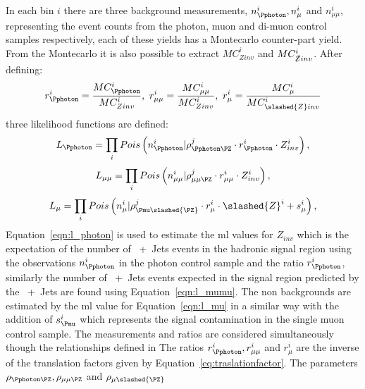In each \HT bin $i$ there are three background measurements, $n_{\Pphoton}^{i}, 
n^{i}_{\mu}$ and $n^{i}_{\mu\mu}$, representing the event counts from the 
photon, muon and di-muon control samples respectively, each of these yields has 
a Montecarlo counter-part yield. From the Montecarlo it is also possible to 
extract $MC^{i}_{Zinv}$ and $MC^{i}_{\slashed{Z}inv}$. After defining:
\begin{equation}
  r^{i}_{\Pphoton} = \frac{MC^{i}_{\Pphoton}}{MC^{i}_{Zinv}},~ r^{i}_{\mu\mu} = \frac{MC^{i}_{\mu\mu}}{MC^{i}_{Zinv}},~r^{i}_{\mu} = \frac{MC^{i}_{\mu}}{MC^{i}_{\slashed{Z}inv}}
\end{equation}
three likelihood functions are defined:
\begin{equation}
  L_{\Pphoton} = \prod_{i}Pois\left(n^{i}_\Pphoton|\rho^{j}_{\Pphoton\PZ} \cdot  r^{i}_{\Pphoton}\cdot  Z_{inv}^{i} \right),
  \label{eqn:l_photon}
\end{equation}
\begin{equation}
  L_{\mu\mu} = \prod_{i}Pois\left(n^{i}_{\mu\mu}|\rho^{j}_{\mu\mu\PZ}\cdot r^{i}_{\mu\mu}\cdot  Z^{i}_{inv}\right),
  \label{eqn:l_mumu}
\end{equation}
\begin{equation}
  L_{\mu} = \prod_{i}Pois\left(n^{i}_{\mu}|\rho^{j}_{\Pmu\slashed{\PZ}}\cdot  r^{i}_{\mu}\cdot  \slashed{Z}^{i}+s^{i}_{\mu}\right),
  \label{eqn:l_mu}
\end{equation}
Equation~\eqref{eqn:l_photon} is used to estimate the \ac{ml} values for 
$Z_{inv}$ which is the expectation of the number of 
\HepProcess{\PZ\to\Pnu\Pnu}~+~Jets events in the hadronic signal region using 
the observations $n_{\Pphoton}^{i}$ in the photon control sample and the ratio 
$r^{i}_{\Pphoton}$, similarly the number of \HepProcess{\PZ\to\Pnu\Pnu}~+~Jets 
events expected in the signal region predicted by the 
\HepProcess{\PZ\to\Pmu\Pmu}~+~Jets are found using Equation~\eqref{eqn:l_mumu}. 
The non \HepProcess{\PZ\to\Pnu\Pnu} backgrounds are estimated by the \ac{ml} 
value for Equation~\eqref{eqn:l_mu} in a similar way with the addition of 
$s^{i}_{\Pmu}$ which represents the signal contamination in the single muon 
control sample. The measurements and ratios are considered simultaneously 
though the relationships defined in 
The ratios $r^{i}_{\Pphoton}, r^{i}_{\mu\mu}$ and $r^{i}_{\mu}$ are the inverse 
of the translation factors given by Equation~\eqref{eq:traslationfactor}. The 
parameters $\rho_{\Pphoton\PZ}, \rho_{\mu\mu\PZ}$ and $\rho_{\mu\slashed{\PZ}}$ 
